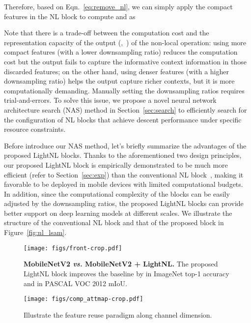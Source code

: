 \documentclass[10pt,twocolumn,letterpaper]{article}
\begin{document}
Therefore, based on Eqn.~\eqref{eq:remove_nl}, we can simply apply the compact features  in the NL block to compute  and  as

Note that there is a trade-off between the computation cost and the representation capacity of the output (\ie,~) of the non-local operation: using more compact features (with a lower downsampling ratio) reduces the computation cost but the output fails to capture the informative context information in those discarded features; on the other hand, using denser features (with a higher downsampling ratio) helps the output capture richer contexts, but it is more computationally demanding. Manually setting the downsampling ratios requires trial-and-errors. To solve this issue, we propose a novel neural network architecture search (NAS) method in Section~\ref{sec:search} to efficiently search for the configuration of NL blocks that achieve descent performance under specific resource constraints. 

Before introduce our NAS method, let's briefly summarize the advantages of the proposed LightNL blocks. Thanks to the aforementioned two design principles, our proposed LightNL block is empirically demonstrated to be much  more  efficient (refer to Section~\ref{sec:exp}) than the conventional NL block~\cite{wang2018non}, making it favorable to be deployed in mobile devices with limited computational budgets. In addition, since the computational complexity of the blocks can be easily adjusted by the downsampling ratios, the proposed LightNL blocks can provide better support on deep learning models at different scales. We illustrate the structure of the conventional NL block and that of the proposed block in Figure~\ref{fig:nl_lsam}.

\begin{figure}[tb]
\centering
\texttt{[image: figs/front-crop.pdf]}
\caption{\textbf{MobileNetV2 \emph{vs.} MobileNetV2 + LightNL.} The proposed LightNL block improves the baseline by  in ImageNet top-1 accuracy and  in PASCAL VOC 2012 mIoU.}
\label{fig:clsseg}
\vspace{-1em}
\end{figure}


\begin{figure*}[tb]
\centering
\texttt{[image: figs/comp\_attmap-crop.pdf]}
\caption{Illustrate the feature reuse paradigm along channel dimension.}
\label{fig:fig3}
\vspace{-1em}
\end{figure*}
\end{document}
